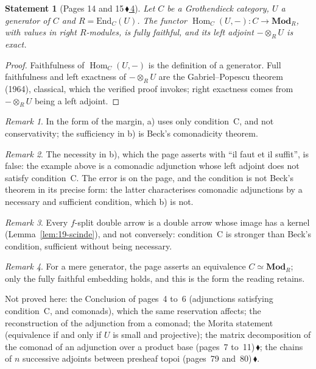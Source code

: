 \documentclass[11pt]{article}
\newcommand{\q}[1]{“#1”}
\newcommand{\piste}[1]{\,\href{https://grothendieck.commutator.io/findings/\##1}{\textcolor{piste}{\ensuremath{\blacklozenge}}}}
\newcommand{\lie}[1]{\,\href{https://grothendieck.commutator.io/timeline/\#works}{\textcolor{frise}{\ensuremath{\blacklozenge}\,\textup{#1}}}}
\theoremstyle{plain}
\newtheorem*{enonce}{Statement}
\theoremstyle{definition}
\theoremstyle{remark}
\newtheorem*{remarque}{Remark}
\begin{document}
\begin{enonce}[Pages 14 and 15\lie{4}]
Let $C$ be a Grothendieck category, $U$ a generator of $C$ and $R = \mathrm{End}_C(U)$. The functor $\operatorname{Hom}_C(U, -) : C \to \mathbf{Mod}_R$, with values in right $R$-modules, is fully faithful, and its left adjoint $- \otimes_R U$ is exact.
\end{enonce}

\begin{proof}
Faithfulness of $\operatorname{Hom}_C(U, -)$ is the definition of a generator. Full faithfulness and left exactness of $- \otimes_R U$ are the Gabriel--Popescu theorem (1964), classical, which the verified proof invokes; right exactness comes from $- \otimes_R U$ being a left adjoint.
\end{proof}

\begin{remarque}
In the form of the margin, a) uses only condition~C, and not conservativity; the sufficiency in b) is Beck's comonadicity theorem.
\end{remarque}

\begin{remarque}
The necessity in b), which the page asserts with \q{il faut et il suffit}, is false: the example above is a comonadic adjunction whose left adjoint does not satisfy condition~C. The error is on the page, and the condition is not Beck's theorem in its precise form: the latter characterises comonadic adjunctions by a necessary and sufficient condition, which b) is not.
\end{remarque}

\begin{remarque}
Every $f$-split double arrow is a double arrow whose image has a kernel (Lemma~\ref{lem:19-scinde}), and not conversely: condition~C is stronger than Beck's condition, sufficient without being necessary.
\end{remarque}

\begin{remarque}
For a mere generator, the page asserts an equivalence $C \simeq \mathbf{Mod}_R$; only the fully faithful embedding holds, and this is the form the reading retains.
\end{remarque}

\noindent Not proved here: the Conclusion of pages~4 to~6 (adjunctions satisfying condition~C, and comonads), which the same reservation affects; the reconstruction of the adjunction from a comonad; the Morita statement (equivalence if and only if $U$ is small and projective); the matrix decomposition of the comonad of an adjunction over a product base (pages~7 to~11)\piste{19-comonad-matrix-product-base}; the chains of $n$ successive adjoints between presheaf topoi (pages~79 and~80)\piste{19-adjoint-chains-length-n}.
\end{document}
